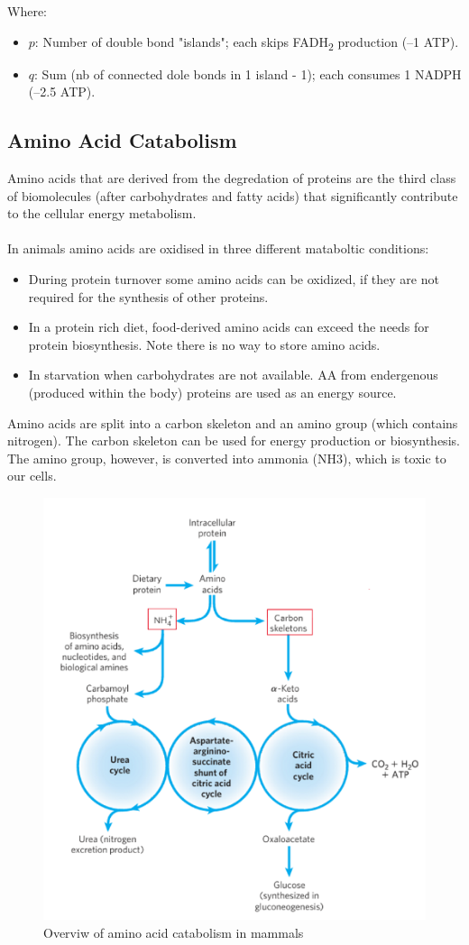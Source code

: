\documentclass[../main.tex]{subfiles}
\begin{document}
Where:
\begin{itemize}
	\item \( p \): Number of double bond "islands"; each skips FADH\textsubscript{2} production (–1 ATP).
	\item \( q \): Sum (nb of connected dole bonds in 1 island - 1); each consumes 1 NADPH (–2.5 ATP).
\end{itemize}


\subsection{Amino Acid Catabolism}
Amino acids that are derived from the degredation of proteins are the third class of biomolecules (after carbohydrates and fatty acids) that significantly contribute to the cellular energy metabolism. \\
\\
In animals amino acids are oxidised in three different mataboltic conditions: 
\begin{itemize}
	\item During protein turnover some amino acids can be oxidized, if they are not required for the synthesis of other proteins. 
	\item In a protein rich diet, food-derived amino acids can exceed the needs for protein biosynthesis. Note there is no way to store amino acids.
	\item In starvation when carbohydrates are not available. AA from endergenous (produced within the body) proteins are used as an energy source.   
\end{itemize}
Amino acids are split into a carbon skeleton and an amino group (which contains nitrogen). The carbon skeleton can be used for energy production or biosynthesis. The amino group, however, is converted into ammonia (NH3), which is toxic to our cells.
\begin{figure}[H]
	\centering
	\includegraphics[width = 0.7 \textwidth]{AA1_1}
	\caption{Overviw of amino acid catabolism in mammals}
\end{figure}
\end{document}
